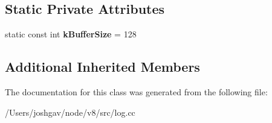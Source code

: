 \subsection*{Static Private Attributes}
\begin{DoxyCompactItemize}
\item 
static const int {\bfseries k\+Buffer\+Size} = 128\hypertarget{classv8_1_1internal_1_1_profiler_a09521e88c87161125109300887644e1c}{}\label{classv8_1_1internal_1_1_profiler_a09521e88c87161125109300887644e1c}

\end{DoxyCompactItemize}
\subsection*{Additional Inherited Members}


The documentation for this class was generated from the following file\+:\begin{DoxyCompactItemize}
\item 
/\+Users/joshgav/node/v8/src/log.\+cc\end{DoxyCompactItemize}
